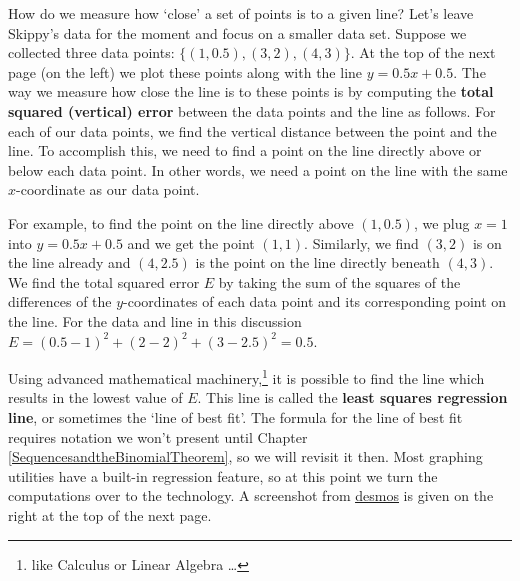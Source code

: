 \documentclass{ximera}
\begin{document}
How do we measure how `close' a set of points is to a given line?   Let's leave Skippy's data for the moment and focus on a smaller data set.  Suppose we collected three data points: $\{(1, 0.5), (3, 2), (4, 3)\}$.  At the top of the next page (on the left) we plot these points along with the line $y = 0.5 x + 0.5$.   The way we measure how close the line is to these points is by computing the \textbf{total squared (vertical) error} between the data points and the line as follows.   For each of our data points, we find the vertical distance between the point and the line.  To accomplish this, we need to find a point on the line directly above or below each data point.  In other words, we need a point on the line with the same $x$-coordinate as our data point.  



For example, to find the point on the line directly above $(1,0.5)$, we plug $x=1$ into $y=0.5x + 0.5$ and we get the point $(1,1)$.  Similarly, we find $(3,2)$ is on the line already and $(4,2.5)$ is the point on the line directly beneath $(4,3)$.   We find the total squared error $E$ by taking the sum of the squares of the differences of the $y$-coordinates of each data point and its corresponding point on the line. For the data and line in this discussion $E = (0.5-1)^2+(2-2)^2+\left(3-2.5\right)^2 = 0.5$.  



Using advanced mathematical machinery,\footnote{like Calculus or Linear Algebra \ldots} it is possible to find the line which results in the lowest value of $E$.  This line is called the \textbf{least squares regression line}, or sometimes the `line of best fit'.  The formula for the line of best fit requires notation we won't present until Chapter \ref{SequencesandtheBinomialTheorem}, so we will revisit it then.  Most graphing utilities have a built-in regression feature, so at this point we turn the computations over to the technology.  A screenshot from \href{www.desmos.com}{\underline{desmos}} is given on the right at the top of the next page.  
\end{document}
